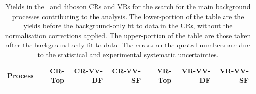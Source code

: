 \begin{table}[!htb]
\begin{center}
\setlength{\tabcolsep}{0.0pc}
{\scriptsize
\caption{
Yields in the \ttbar~and diboson CRs and VRs for the \bWN search for the main background processes
contributing to the analysis.
The lower-portion of the table are the yields before the background-only fit to data
in the CRs, without the normalisation corrections applied.
The upper-portion of the table are those taken after the background-only fit to data.
The errors on the quoted numbers are due to the statistical and experimental systematic uncertainties.
}
\label{tab:bkgonly_CRVR}
\begin{tabular*}{\textwidth}{@{\extracolsep{\fill}}lrrrrrr}
\noalign{\smallskip}\hline\noalign{\smallskip}
\noalign{\smallskip}\hline\noalign{\smallskip}
\textbf{Process}           & \textbf{CR-Top}            & \textbf{CR-VV-DF}            & \textbf{CR-VV-SF}            & \textbf{VR-Top}           & \textbf{VR-VV-DF}            & \textbf{VR-VV-SF}              \\[-0.05cm]
\noalign{\smallskip}\hline\noalign{\smallskip}



\end{tabular*}}
\end{center}
\end{table}
